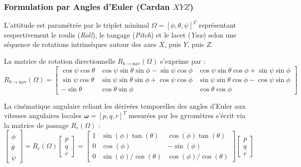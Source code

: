 \documentclass[../Formulations_Kalman.tex]{subfiles}
\begin{document}
\subsubsection{Formulation par Angles d'Euler (Cardan $XYZ$)}
L'attitude est paramétrée par le triplet minimal $\Omega = [\phi, \theta, \psi]^T$ représentant respectivement le roulis (\textit{Roll}), le tangage (\textit{Pitch}) et le lacet (\textit{Yaw}) selon une séquence de rotations intrinsèques autour des axes $X$, puis $Y$, puis $Z$.

La matrice de rotation directionnelle $R_{b \to \text{nav}}(\Omega)$ s'exprime par :
\begin{equation}
R_{b \to \text{nav}}(\Omega) = \begin{bmatrix}
\cos\psi\cos\theta & \cos\psi\sin\theta\sin\phi - \sin\psi\cos\phi & \cos\psi\sin\theta\cos\phi + \sin\psi\sin\phi \\
\sin\psi\cos\theta & \sin\psi\sin\theta\sin\phi + \cos\psi\cos\phi & \sin\psi\sin\theta\cos\phi - \cos\psi\sin\phi \\
-\sin\theta & \cos\theta\sin\phi & \cos\theta\cos\phi
\end{bmatrix}
\end{equation}

La cinématique angulaire reliant les dérivées temporelles des angles d'Euler aux vitesses angulaires locales $\boldsymbol{\omega} = [p, q, r]^T$ mesurées par les gyromètres s'écrit via la matrice de passage $R_{c}(\Omega)$ :
\begin{equation}
\begin{bmatrix} \dot{\phi} \\ \dot{\theta} \\ \dot{\psi} \end{bmatrix} = R_{c}(\Omega) \begin{bmatrix} p \\ q \\ r \end{bmatrix} = 
\begin{bmatrix} 
1 & \sin(\phi)\tan(\theta) & \cos(\phi)\tan(\theta) \\ 
0 & \cos(\phi) & -\sin(\phi) \\ 
0 & \sin(\phi)/\cos(\theta) & \cos(\phi)/\cos(\theta) 
\end{bmatrix}
\begin{bmatrix} p \\ q \\ r \end{bmatrix}
\end{equation}
\end{document}
